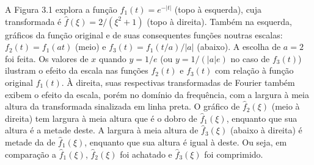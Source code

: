 \begin{figure}[ht!]
	\vspace{-1mm}	%
	\begin{center}
	\end{center}
	\vspace{-2mm}	%
	\label{ex1_fig1}
\end{figure}

A Figura 3.1 explora a função $f_{1}(t)=e^{-|t|}$ (topo à esquerda), cuja transformada é $\hat{f}(\xi) = 2/(\xi^{2} + 1)$ (topo à direita). Também na esquerda, gráficos da função original e de suas consequentes funções noutras escalas: $f_{2}(t) = f_{1}(at)$ (meio) e $f_{3}(t) = f_{1}(t/a)/|a|$ (abaixo). A escolha de $a=2$ foi feita. Os valores de $x$ quando $y=1/ e$ (ou $y=1/(|a|e)$ no caso de $f_{3}(t)$) ilustram o efeito da escala nas funções $f_{2}(t)$ e $f_{3}(t)$ com relação à função original $f_{1}(t)$. À direita, suas respectivas transformadas de Fourier também exibem o efeito da escala, porém no domínio da frequência, com a largura à meia altura da transformada sinalizada em linha preta. O gráfico de $\hat{f}_{2}(\xi)$ (meio à direita) tem largura à meia altura que é o dobro de $\hat{f}_{1}(\xi)$, enquanto que sua altura é a metade deste. A largura à meia altura de $\hat{f}_{3}(\xi)$ (abaixo à direita) é metade da de $\hat{f}_{1}(\xi)$, enquanto que sua altura é igual à deste. Ou seja, em comparação a $\hat{f}_{1}(\xi)$, $\hat{f}_{2}(\xi)$ foi achatado e $\hat{f}_{3}(\xi)$ foi comprimido. 

